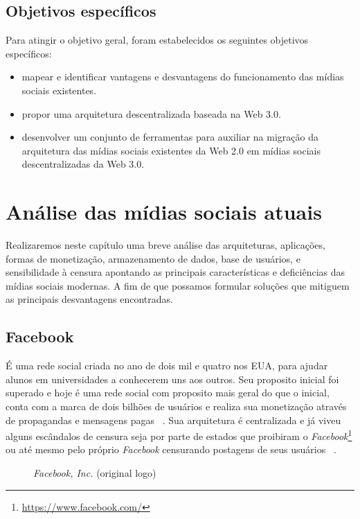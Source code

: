 \section{Objetivos específicos}

Para atingir o objetivo geral, foram estabelecidos os seguintes objetivos específicos:

\begin{itemize}
    \item mapear e identificar vantagens e desvantagens do funcionamento das mídias sociais existentes.
    \item propor uma arquitetura descentralizada baseada na Web 3.0.
    \item desenvolver um conjunto de ferramentas para auxiliar na migração da arquitetura das mídias sociais existentes da Web 2.0 em mídias sociais descentralizadas da Web 3.0.
\end{itemize}

\chapter{Análise das mídias sociais atuais}

Realizaremos neste capítulo uma breve análise das arquiteturas, aplicações, formas de monetização, armazenamento de dados, base de usuários, e sensibilidade à censura apontando as principais características e deficiências das mídias sociais modernas.
A fim de que possamos formular soluções que mitiguem as principais desvantagens encontradas.

\section{Facebook}

É uma rede social criada no ano de dois mil e quatro nos EUA, para ajudar alunos em universidades a conhecerem uns aos outros.
Seu proposito inicial foi superado e hoje é uma rede social com proposito mais geral do que o inicial,
conta com a marca de dois bilhões de usuários e realiza sua monetização através de propagandas e mensagens pagas~\cite{Facebook1} \cite{Facebook2}.
Sua arquitetura é centralizada e já viveu alguns escândalos de censura seja por parte de estados que proibiram o \textit{Facebook}\footnote{\url{https://www.facebook.com/}} ou até mesmo pelo próprio \textit{Facebook} censurando postagens de seus usuários~\cite{Facebook4} \cite{Facebook5}.

\begin{figure}[htb!]
    \centering
    
    \caption[Facebook's logo]{\label{fig:facebook-icon}
        \textit{Facebook, Inc.} (original logo) %
    }
\end{figure}

